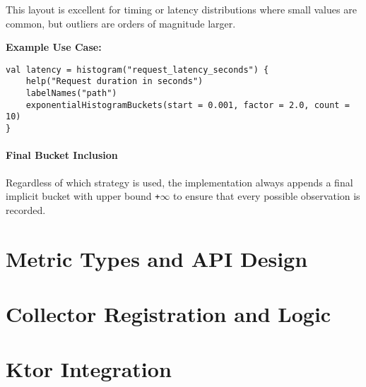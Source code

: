 This layout is excellent for timing or latency distributions where small values are common, but outliers are orders of magnitude larger.

\vspace{0.5em}
\noindent
\textbf{Example Use Case:}
\begin{verbatim}
val latency = histogram("request_latency_seconds") {
    help("Request duration in seconds")
    labelNames("path")
    exponentialHistogramBuckets(start = 0.001, factor = 2.0, count = 10)
}
\end{verbatim}

\paragraph{Final Bucket Inclusion}

Regardless of which strategy is used, the implementation always appends a final implicit bucket with upper bound \texttt{+\(\infty\)} to ensure that every possible observation is recorded.






\section{Metric Types and API Design}
\lipsum[1]


\section{Collector Registration and Logic}
\lipsum[1]


\section{Ktor Integration}
\lipsum[1]
